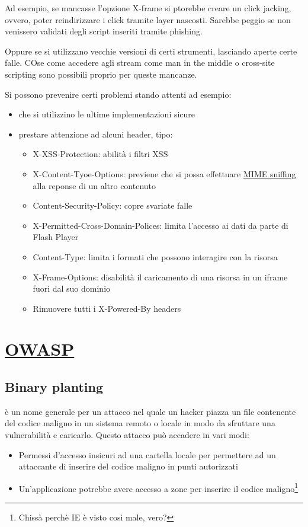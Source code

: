 \documentclass[11pt,a4paper]{book}
\begin{document}
Ad esempio, se mancasse l'opzione X-frame si ptorebbe creare un click jacking, ovvero, poter reindirizzare i click tramite layer nascosti. Sarebbe peggio se non venissero validati degli script inseriti tramite phishing.

Oppure se si utilizzano vecchie versioni di certi strumenti, lasciando aperte certe falle. COse come accedere agli stream come man in the middle o cross-site scripting sono possibili proprio per queste mancanze.

Si possono prevenire certi problemi stando attenti ad esempio:
\begin{itemize}
	\item che si utilizzino le ultime implementazioni sicure
	\item prestare attenzione ad alcuni header, tipo:
	\begin{itemize}
		\item X-XSS-Protection: abilità i filtri XSS
		\item X-Content-Tyoe-Options: previene che si possa effettuare \href{https://www.keycdn.com/support/what-is-mime-sniffing}{MIME sniffing} alla reponse di un altro contenuto
		\item Content-Security-Policy: copre svariate falle
		\item X-Permitted-Cross-Domain-Polices: limita l'accesso ai dati da parte di Flash Player
		\item Content-Type: limita i formati che possono interagire con la risorsa
		\item X-Frame-Options: disabilità il caricamento di una risorsa in un iframe fuori dal suo dominio
		\item Rimuovere tutti i X-Powered-By headers
	\end{itemize}
\end{itemize}


\chapter{\href{https://owasp.org/www-community/attacks/}{OWASP}}
\section{Binary planting}
è un nome generale per un attacco nel quale un hacker piazza un file contenente del codice maligno in un sistema remoto o locale in modo da sfruttare una vulnerabilità e caricarlo. Questo attacco può accadere in vari modi:
\begin{itemize}
	\item Permessi d'accesso insicuri ad una cartella locale per permettere ad un attaccante di inserire del codice maligno in punti autorizzati
	\item Un'applicazione potrebbe avere accesso a zone per inserire il codice maligno\footnote{Chissà perchè IE è visto così male, vero?}
\end{itemize}
\end{document}
